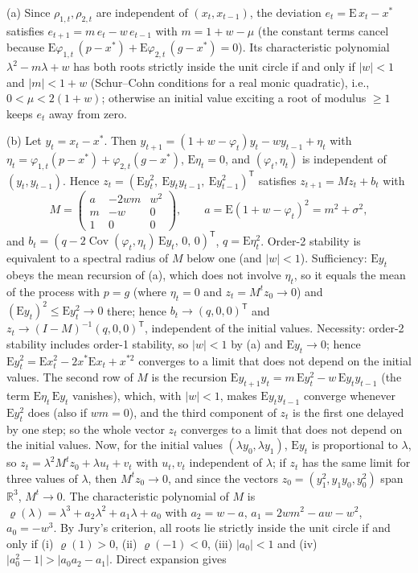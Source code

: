 \begin{thSproof}
(a) Since $\rho_{1,t},\rho_{2,t}$ are independent of $(x_t,x_{t-1})$, the deviation $e_t=\mathrm E\,x_t-x^*$ satisfies $e_{t+1}=m\,e_t-w\,e_{t-1}$ with $m=1+w-\mu$ (the constant terms cancel because $\mathrm E\varphi_{1,t}\,(p-x^*)+\mathrm E\varphi_{2,t}\,(g-x^*)=0$). Its characteristic polynomial $\lambda^2-m\lambda+w$ has both roots strictly inside the unit circle if and only if $\lvert w\rvert<1$ and $\lvert m\rvert<1+w$ (Schur--Cohn conditions for a real monic quadratic), i.e., $0<\mu<2(1+w)$; otherwise an initial value exciting a root of modulus $\ge1$ keeps $e_t$ away from zero.

(b) Let $y_t=x_t-x^*$. Then $y_{t+1}=(1+w-\varphi_t)y_t-wy_{t-1}+\eta_t$ with $\eta_t=\varphi_{1,t}(p-x^*)+\varphi_{2,t}(g-x^*)$, $\mathrm E\eta_t=0$, and $(\varphi_t,\eta_t)$ is independent of $(y_t,y_{t-1})$. Hence $z_t=(\mathrm Ey_t^2,\ \mathrm Ey_ty_{t-1},\ \mathrm Ey_{t-1}^2)^{\mathsf T}$ satisfies $z_{t+1}=Mz_t+b_t$ with
\begin{equation*}
M=\begin{pmatrix} a & -2wm & w^2\\ m & -w & 0\\ 1&0&0\end{pmatrix},\qquad a=\mathrm E(1+w-\varphi_t)^2=m^2+\sigma^2,
\end{equation*}
and $b_t=(q-2\operatorname{Cov}(\varphi_t,\eta_t)\,\mathrm Ey_t,\,0,\,0)^{\mathsf T}$, $q=\mathrm E\eta_t^2$. Order-2 stability is equivalent to a spectral radius of $M$ below one (and $\lvert w\rvert<1$). Sufficiency: $\mathrm Ey_t$ obeys the mean recursion of (a), which does not involve $\eta_t$, so it equals the mean of the process with $p=g$ (where $\eta_t=0$ and $z_t=M^tz_0\to0$) and $(\mathrm Ey_t)^2\le\mathrm Ey_t^2\to0$ there; hence $b_t\to(q,0,0)^{\mathsf T}$ and $z_t\to(I-M)^{-1}(q,0,0)^{\mathsf T}$, independent of the initial values. Necessity: order-2 stability includes order-1 stability, so $\lvert w\rvert<1$ by (a) and $\mathrm Ey_t\to0$; hence $\mathrm Ey_t^2=\mathrm Ex_t^2-2x^*\mathrm Ex_t+x^{*2}$ converges to a limit that does not depend on the initial values. The second row of $M$ is the recursion $\mathrm Ey_{t+1}y_t=m\,\mathrm Ey_t^2-w\,\mathrm Ey_ty_{t-1}$ (the term $\mathrm E\eta_t\,\mathrm Ey_t$ vanishes), which, with $\lvert w\rvert<1$, makes $\mathrm Ey_ty_{t-1}$ converge whenever $\mathrm Ey_t^2$ does (also if $wm=0$), and the third component of $z_t$ is the first one delayed by one step; so the whole vector $z_t$ converges to a limit that does not depend on the initial values. Now, for the initial values $(\lambda y_0,\lambda y_1)$, $\mathrm Ey_t$ is proportional to $\lambda$, so $z_t=\lambda^2M^tz_0+\lambda u_t+v_t$ with $u_t,v_t$ independent of $\lambda$; if $z_t$ has the same limit for three values of $\lambda$, then $M^tz_0\to0$, and since the vectors $z_0=(y_1^2,y_1y_0,y_0^2)$ span $\mathbb R^3$, $M^t\to0$. The characteristic polynomial of $M$ is $\varrho(\lambda)=\lambda^3+a_2\lambda^2+a_1\lambda+a_0$ with $a_2=w-a$, $a_1=2wm^2-aw-w^2$, $a_0=-w^3$. By Jury's criterion, all roots lie strictly inside the unit circle if and only if (i) $\varrho(1)>0$, (ii) $\varrho(-1)<0$, (iii) $\lvert a_0\rvert<1$ and (iv) $\lvert a_0^2-1\rvert>\lvert a_0a_2-a_1\rvert$. Direct expansion gives

\end{thSproof}
